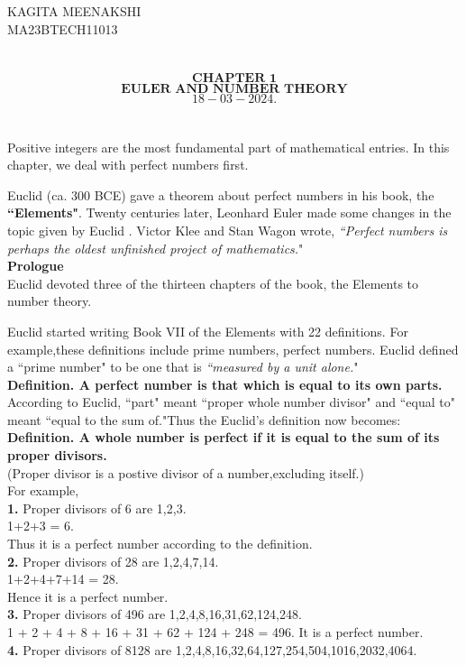 \documentclass[a4paper,11pt]{article}
\begin{document}
\noindent KAGITA MEENAKSHI\\
MA23BTECH11013\\
\\
\\
$$\textbf{CHAPTER 1}$$
$$\textbf{EULER AND NUMBER THEORY}$$
$${18-03-2024}.$$\\
\\
Positive integers are the most fundamental part of mathematical entries. In this chapter, we deal with perfect numbers first.


 Euclid (ca. 300 BCE) gave a theorem about perfect 
numbers in his book, the \textbf{``Elements"}. Twenty centuries later, Leonhard 
Euler made some changes in the topic given by Euclid .
Victor Klee and Stan Wagon wrote, \textit{``Perfect numbers is perhaps the oldest unfinished 
project of mathematics.}" \\

\noindent \textbf{Prologue}\\
Euclid
devoted three of the thirteen chapters of the book, the Elements to number 
theory.

Euclid started writing Book VII of the Elements with 
22 definitions. For example,these definitions include prime numbers, perfect numbers. Euclid defined 
a ``prime number" to be one that is \textit{``measured by a unit alone.}" \\
 \textbf{Definition. A perfect number is that which is equal to its own parts.}\\ 
According to Euclid, ``part" meant ``proper 
whole number divisor" and  ``equal to" meant ``equal to the sum of."Thus the Euclid's definition now becomes:\\
 \textbf{Definition.
 A whole number is perfect if it is equal to the sum of its proper 
divisors.} \\
(Proper divisor is a postive divisor of a number,excluding itself.)\\
For example, \\
\textbf{1.} Proper divisors of 6 are 1,2,3.\\
1+2+3 = 6.\\ Thus it is a perfect number according to the definition.\\
\textbf{2.} Proper divisors of 28 are 1,2,4,7,14.\\
1+2+4+7+14 = 28. \\ Hence it is a perfect number.\\
\textbf{3.} Proper divisors of 496 are 1,2,4,8,16,31,62,124,248.\\
1 + 2 + 4 + 8 + 16 + 31 + 62 + 124 + 248 = 496. It is a perfect number.\\
\noindent \textbf{4.} Proper divisors of 8128 are 1,2,4,8,16,32,64,127,254,504,1016,2032,4064.\\
\end{document}
